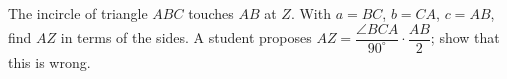 The incircle of triangle $ABC$ touches $AB$ at $Z$. With $a=BC$, $b=CA$, $c=AB$, find $AZ$ in terms of the sides. A student proposes $AZ=\dfrac{\angle BCA}{90^\circ}\cdot\dfrac{AB}2$; show that this is wrong.
